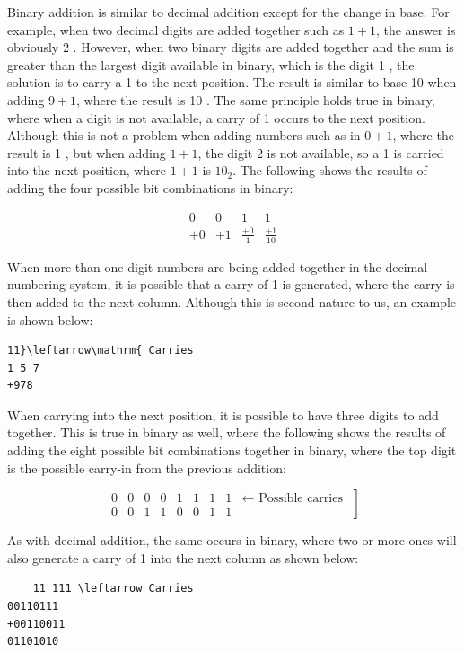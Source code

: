 \documentclass[10pt]{book}
\begin{document}
\begin{center}
\begin{center}
\begin{center}
\begin{center}
\begin{center}
Binary addition is similar to decimal addition except for the change in base. For example, when two decimal digits are added together such as $1+1$, the answer is obviously 2 . However, when two binary digits are added together and the sum is greater than the largest digit available in binary, which is the digit 1 , the solution is to carry a 1 to the next position. The result is similar to base 10 when adding $9+1$, where the result is 10 . The same principle holds true in binary, where when a digit is not available, a carry of 1 occurs to the next position. Although this is not a problem when adding numbers such as in $0+1$, where the result is 1 , but when adding $1+1$, the digit 2 is not available, so a 1 is carried into the next position, where $1+1$ is $10_{2}$. The following shows the results of adding the four possible bit combinations in binary:

$$
\begin{array}{rrrr}
0 & 0 & 1 & 1 \\
+0 & +1 & \frac{+0}{1} & \frac{+1}{10}
\end{array}
$$

When more than one-digit numbers are being added together in the decimal numbering system, it is possible that a carry of 1 is generated, where the carry is then added to the next column. Although this is second nature to us, an example is shown below:

\begin{verbatim}
11}\leftarrow\mathrm{ Carries
1 5 7
+978
\end{verbatim}

When carrying into the next position, it is possible to have three digits to add together. This is true in binary as well, where the following shows the results of adding the eight possible bit combinations together in binary, where the top digit is the possible carry-in from the previous addition:

$$
\left.\begin{array}{rrrrrrrrr}
0 & 0 & 0 & 0 & 1 & 1 & 1 & 1 & \leftarrow \text { Possible carries } \\
0 & 0 & 1 & 1 & 0 & 0 & 1 & 1
\end{array}\right]
$$

As with decimal addition, the same occurs in binary, where two or more ones will also generate a carry of 1 into the next column as shown below:

\begin{verbatim}
    11 111 \leftarrow Carries
00110111
+00110011
01101010
\end{verbatim}


\end{center}
\end{center}
\end{center}
\end{center}
\end{center}
\end{document}

